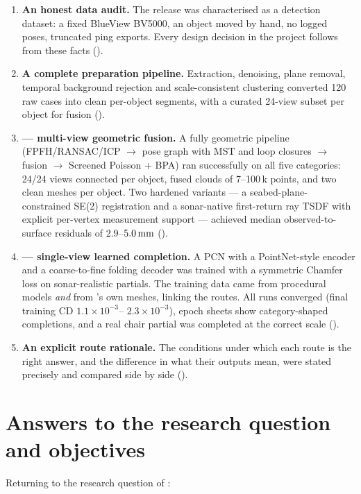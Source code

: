 \begin{enumerate}
  \item \textbf{An honest data audit.} The \suop{} release was characterised
  as a detection dataset: a fixed BlueView BV5000, an object moved by hand,
  no logged poses, truncated ping exports. Every design decision in the
  project follows from these facts ().
  \item \textbf{A complete preparation pipeline.} Extraction, denoising,
  plane removal, temporal background rejection and scale-consistent clustering
  converted 120 raw cases into clean per-object segments, with a curated
  24-view subset per object for fusion ().
  \item \textbf{\routeA{} --- multi-view geometric fusion.} A fully geometric
  pipeline (FPFH/RANSAC/ICP $\to$ pose graph with MST and loop closures $\to$
  fusion $\to$ Screened Poisson + BPA) ran successfully on all five
  categories: 24/24 views connected per object, fused clouds of 7--100\,k
  points, and two clean meshes per object. Two hardened variants --- a
  seabed-plane-constrained SE(2) registration and a sonar-native first-return
  ray TSDF with explicit per-vertex measurement support --- achieved median
  observed-to-surface residuals of $2.9$--$5.0\,\text{mm}$ ().
  \item \textbf{\routeB{} --- single-view learned completion.} A PCN with a
  PointNet-style encoder and a coarse-to-fine folding decoder was trained with
  a symmetric Chamfer loss on sonar-realistic partials. The training data came
  from procedural models \emph{and} from \routeA{}'s own meshes, linking the
  routes. All runs converged (final training CD $1.1\times10^{-3}$--
  $2.3\times10^{-3}$), epoch sheets show category-shaped completions, and a
  real chair partial was completed at the correct scale
  ().
  \item \textbf{An explicit route rationale.} The conditions under which each
  route is the right answer, and the difference in what their outputs mean,
  were stated precisely and compared side by side ().
\end{enumerate}

\section{Answers to the research question and objectives}
\label{sec:conc_objectives}

Returning to the research question of :

